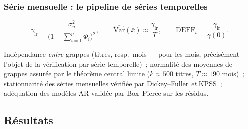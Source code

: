 \subsubsection*{Série mensuelle : le pipeline de séries temporelles}
\[
  \gamma_{\mathrm{lr}}
     = \frac{\sigma^2_\eta}{\bigl(1-\sum_{i=1}^{p}\Phi_i\bigr)^{2}},
  \qquad
  \widehat{\mathrm{Var}}(\bar x) \approx \frac{\gamma_{\mathrm{lr}}}{T},
  \qquad
  \mathrm{DEFF}_t = \frac{\gamma_{\mathrm{lr}}}{\gamma(0)} .
\]

\begin{conditions}
Indépendance \emph{entre} grappes (titres, resp.\ mois --- pour les mois,
précisément l'objet de la vérification par série temporelle)~;
normalité des moyennes de grappes assurée par le théorème central limite
($k \approx 500$ titres, $T \approx 190$ mois)~; stationnarité des séries
mensuelles vérifiée par Dickey--Fuller \emph{et} KPSS~; adéquation des
modèles AR validée par Box--Pierce sur les résidus.
\end{conditions}

\subsection{Résultats}

